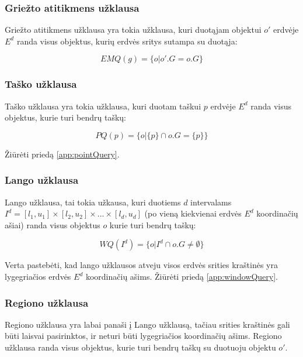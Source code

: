 \subsubsection{Griežto atitikmens užklausa}
Griežto atitikmens užklausa yra tokia užklausa, kuri duotąjam objektui $o'$ erdvėje $E^d$ randa visus objektus, kurių erdvės sritys sutampa su duotąja:

\begin{equation}
	EMQ(g) = \{ o | o'.G = o.G \}
\label{eq:ExactMatchQuery}
\end{equation}

\subsubsection{Taško užklausa}
Taško užklausa yra tokia užklausa, kuri duotam taškui $p$ erdvėje $E^d$ randa visus objektus, kurie turi bendrų taškų:

\begin{equation}
	PQ(p) = \{ o | \{p\} \cap o.G = \{p\} \}
\label{eq:ExactMatchQuery}
\end{equation}

Žiūrėti priedą \ref{app:pointQuery}.

\subsubsection{Lango užklausa}
Lango užklausa, tai tokia užkausa, kuri duotiems $d$ intervalams $I^d = [l_1, u_1] \times [l_2, u_2] \times ... \times [l_d, u_d]$ (po vieną kiekvienai erdvės $E^d$ koordinačių ašiai) randa visus objektus $o$ kurie turi bendrų taškų:

\begin{equation}
	WQ(I^d) = \{ o | I^d \cap o.G \neq \emptyset \}
\label{eq:ExactMatchQuery}
\end{equation}

Verta pastebėti, kad lango užklausos atveju visos erdvės srities kraštinės yra lygegriačios erdvės $E^d$ koordinačių ašims.
Žiūrėti priedą \ref{app:windowQuery}.


\subsubsection{Regiono užklausa}
Regiono užklausa yra labai panaši į Lango užklausą, tačiau srities kraštinės gali būti laisvai pasirinktos, ir neturi būti lygegriačios koordinačių ašims.
Regiono užklausa randa visus objektus, kurie turi bendrų taškų su duotuoju objektu $o'$.

